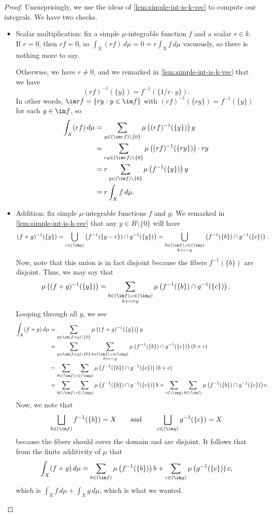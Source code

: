 \documentclass[../notes.tex]{subfiles}
\begin{document}
\begin{proof}
	Unsurprisingly, we use the ideas of \autoref{lem:simple-int-is-k-vec} to compute our integrals. We have two checks.
	\begin{itemize}
		\item Scalar multiplication: fix a simple $\mu$-integrable function $f$ and a scalar $r\in k$. If $r=0$, then $rf=0$, so $\int_X(rf)\,d\mu=0=r\int_Xf\,d\mu$ vacuously, so there is nothing more to say.

		Otherwise, we have $r\ne0$, and we remarked in \autoref{lem:simple-int-is-k-vec} that we have
		\[(rf)^{-1}(\{y\})=f^{-1}(\{1/r\cdot y\}).\]
		In other words, $\im rf=\{ry:y\in\im f\}$ with $(rf)^{-1}(\{ry\})=f^{-1}(\{y\})$ for each $y\in\im f$, so
		\begin{align*}
			\int_X(rf)\,d\mu &= \sum_{y\in(\im rf)\setminus\{0\}}\mu\left((rf)^{-1}(\{y\})\right)y \\
			&= \sum_{ry\in(\im rf)\setminus\{0\}}\mu\left((rf)^{-1}(\{ry\})\right)\cdot ry \\
			&= r\sum_{y\in(\im f)\setminus\{0\}}\mu\left(f^{-1}(\{y\})\right)y \\
			&= r\int_Xf\,d\mu.
		\end{align*}
		\item Addition: fix simple $\mu$-integrable functions $f$ and $g$. We remarked in \autoref{lem:simple-int-is-k-vec} that any $y\in B\setminus\{0\}$ will have
		\[(f+g)^{-1}(\{y\})=\bigcup_{c\in(\im g)}\left(f^{-1}(\{y-c\})\cap g^{-1}(\{y\})\right)=\bigcup_{\substack{b\in(\im f),c\in(\im g)\\b+c=y}}\left(f^{-1}(\{b\})\cap g^{-1}(\{c\})\right).\]
		Now, note that this union is in fact disjoint because the fibers $f^{-1}(\{b\})$ are disjoint. Thus, we may say that
		\[\mu\left((f+g)^{-1}(\{y\})\right)=\sum_{\substack{b\in(\im f),c\in(\im g)\\b+c=y}}\mu\left(f^{-1}(\{b\})\cap g^{-1}(\{c\})\right).\]
		Looping through all $y$, we see
		\begin{align*}
			\int_X(f+g)\,d\mu &= \sum_{y\in\im(f+g)\setminus\{0\}}\mu\left((f+g)^{-1}(\{y\})\right)y \\
			&= \sum_{y\in\im(f+g)\setminus\{0\}}\sum_{\substack{b\in(\im f),c\in(\im g)\\b+c=y}}\mu\left(f^{-1}(\{b\})\cap g^{-1}(\{c\})\right)(b+c) \\
			&= \sum_{b\in(\im f)}\sum_{c\in(\im g)}\mu\left(f^{-1}(\{b\})\cap g^{-1}(\{c\})\right)(b+c) \\
			&= \sum_{b\in(\im f)}\sum_{c\in(\im g)}\mu\left(f^{-1}(\{b\})\cap g^{-1}(\{c\})\right)b+\sum_{c\in(\im g)}\sum_{b\in(\im f)}\mu\left(f^{-1}(\{b\})\cap g^{-1}(\{c\})\right)c.
		\end{align*}
		Now, we note that
		\[\bigsqcup_{b\in(\im f)}f^{-1}(\{b\})=X\qquad\text{and}\qquad\bigsqcup_{c\in(\im g)}g^{-1}(\{c\})=X\]
		because the fibers should cover the domain and are disjoint. It follows that from the finite additivity of $\mu$ that
		\[\int_X(f+g)\,d\mu = \sum_{b\in(\im f)}\mu\left(f^{-1}(\{b\})\right)b+\sum_{c\in(\im g)}\mu\left(g^{-1}(\{c\})\right)c,\]
		which is $\int_Xf\,d\mu+\int_Xg\,d\mu$, which is what we wanted.
		\qedhere
	\end{itemize}
\end{proof}
\end{document}
